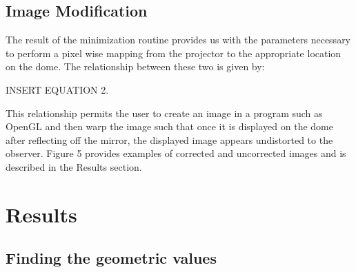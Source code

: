 \documentclass[10pt,letterpaper]{article}
\begin{document}
\subsection*{Image Modification}

The result of the minimization routine provides us with the parameters necessary to perform a pixel wise mapping from the projector to the appropriate location on the dome. 
The relationship between these two is given by:

INSERT EQUATION 2.

This relationship permits the user to create an image in a program such as OpenGL and then warp the image such that once it is displayed on the dome after reflecting off 
the mirror, the displayed image appears undistorted to the observer. Figure 5 provides examples of corrected and uncorrected images and is described in the Results section. 


%

\section*{Results}

\subsection*{Finding the geometric values}
\end{document}
